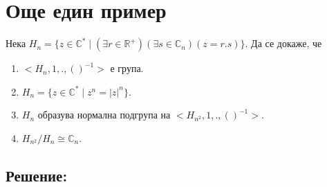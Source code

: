 \documentclass[12pt]{article}
\begin{document}
\section{Още един пример}
Нека \(H_n = \{z \in \mathbb{C}^* \; | \; (\exists r \in \mathbb{R}^+)(\exists s \in \mathbb{C}_n)(z = r.s)\}\). Да се докаже, че
\begin{enumerate}[label=\alph*)]
    \item \(<H_n, 1, ., ()^{-1}>\) е група.
    \item \(H_n = \{z \in \mathbb{C}^* \; | \; z^n = |z|^n\}\).
    \item \(H_n\) образува нормална подгрупа на \(<H_{n^2}, 1, ., ()^{-1}>\).
    \item \(H_{n^2} / H_n \cong \mathbb{C}_n\).
\end{enumerate}
\subsection{Решение:}
\end{document}
